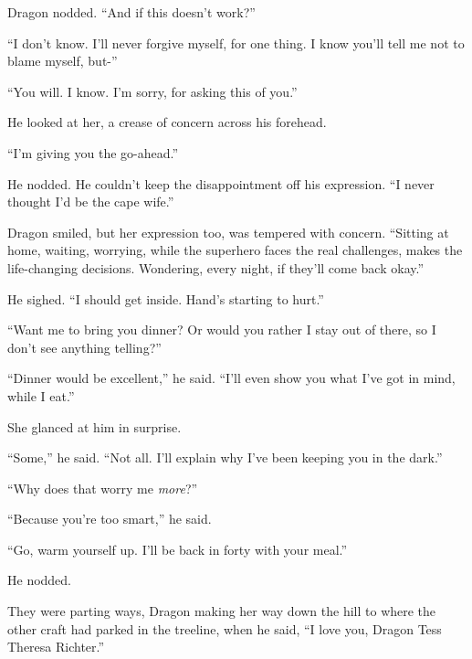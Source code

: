 Dragon nodded.  ``And if this doesn't work?''



``I don't know.  I'll never forgive myself, for one thing.  I know you'll tell me not to blame myself, but-''



``You will.  I know.  I'm sorry, for asking this of you.''



He looked at her, a crease of concern across his forehead.



``I'm giving you the go-ahead.''



He nodded.  He couldn't keep the disappointment off his expression.  ``I never thought I'd be the cape wife.''



Dragon smiled, but her expression too, was tempered with concern.  ``Sitting at home, waiting, worrying, while the superhero faces the real challenges, makes the life-changing decisions.  Wondering, every night, if they'll come back okay.''



He sighed.  ``I should get inside.  Hand's starting to hurt.''



``Want me to bring you dinner?  Or would you rather I stay out of there, so I don't see anything telling?''



``Dinner would be excellent,'' he said.  ``I'll even show you what I've got in mind, while I eat.''



She glanced at him in surprise.



``Some,'' he said.  ``Not all.  I'll explain why I've been keeping you in the dark.''



``Why does that worry me \emph{more}?''



``Because you're too smart,'' he said.



``Go, warm yourself up.  I'll be back in forty with your meal.''



He nodded.



They were parting ways, Dragon making her way down the hill to where the other craft had parked in the treeline, when he said, ``I love you, Dragon Tess Theresa Richter.''



